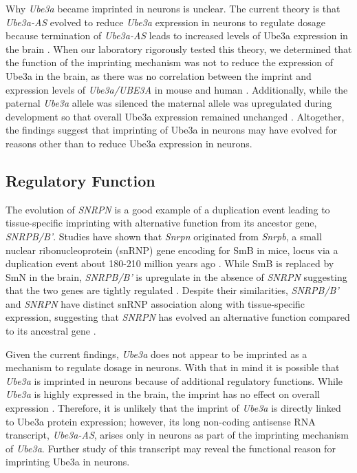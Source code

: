 {Why \textit{Ube3a} became imprinted in neurons is unclear. The current theory is that \textit{Ube3a-AS} evolved to reduce \textit{Ube3a} expression in neurons to regulate dosage because termination of \textit{Ube3a-AS} leads to increased levels of Ube3a expression in the brain \cite{Huang2012,King2013,Meng2013}. When our laboratory rigorously tested this theory, we determined that the function of the imprinting mechanism was not to reduce the expression of Ube3a in the brain, as there was no correlation between the imprint and expression levels of \textit{Ube3a/UBE3A} in mouse and human \cite{Hillman2017}. Additionally, while the paternal \emph{Ube3a} allele was silenced the maternal allele was upregulated during development so that overall Ube3a expression remained unchanged \cite{Hillman2017}. Altogether, the findings suggest that imprinting of Ube3a in neurons may have evolved for reasons other than to reduce Ube3a expression in neurons.

\subsection{Regulatory Function}

The evolution of \textit{SNRPN} is a good example of a duplication event leading to tissue-specific imprinting with alternative function from its ancestor gene, \textit{SNRPB/B’}. Studies have shown that \textit{Snrpn} originated from \textit{Snrpb}, a small nuclear ribonucleoprotein (snRNP) gene encoding for SmB in mice, locus via a duplication event about 180-210 million years ago \cite{Gray1999,Rapkins2006}. While SmB is replaced by SmN in the brain, \textit{SNRPB/B’} is upregulate in the absence of \textit{SNRPN} suggesting that the two genes are tightly regulated \cite{Gray1999,Nahkuri2008}. Despite their similarities, \textit{SNRPB/B’} and \textit{SNRPN} have distinct snRNP association along with tissue-specific expression, suggesting that \textit{SNRPN} has evolved an alternative function compared to its ancestral gene \cite{Huntriss1993}.

Given the current findings, \textit{Ube3a} does not appear to be imprinted as a mechanism to regulate dosage in neurons. With that in mind it is possible that \textit{Ube3a} is imprinted in neurons because of additional regulatory functions. While \textit{Ube3a} is highly expressed in the brain, the imprint has no effect on overall expression \cite{Hillman2017}. Therefore, it is unlikely that the imprint of \textit{Ube3a} is directly linked to Ube3a protein expression; however, its long non-coding antisense RNA transcript, \textit{Ube3a-AS}, arises only in neurons as part of the imprinting mechanism of \textit{Ube3a}. Further study of this transcript may reveal the functional reason for imprinting Ube3a in neurons.

}
